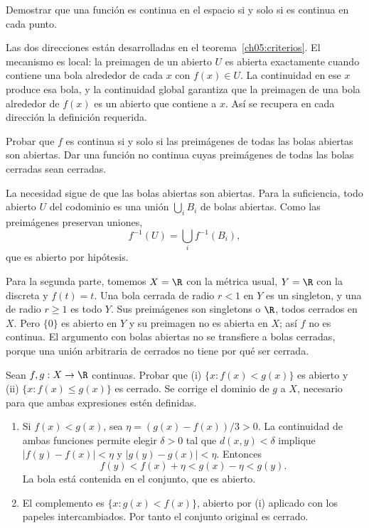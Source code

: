 \begin{ejercicio}\label{ej:lectura-5-2}
Demostrar que una función es continua en el espacio si y solo si es continua en cada punto.
\end{ejercicio}
\begin{solucion}
Las dos direcciones están desarrolladas en el teorema~\ref{ch05:criterios}. El mecanismo es local: la preimagen de un abierto $U$ es abierta exactamente cuando contiene una bola alrededor de cada $x$ con $f(x)\in U$. La continuidad en ese $x$ produce esa bola, y la continuidad global garantiza que la preimagen de una bola alrededor de $f(x)$ es un abierto que contiene a $x$. Así se recupera en cada dirección la definición requerida.
\end{solucion}

\begin{ejercicio}\label{ej:lectura-5-3}
Probar que $f$ es continua si y solo si las preimágenes de todas las bolas abiertas son abiertas. Dar una función no continua cuyas preimágenes de todas las bolas cerradas sean cerradas.
\end{ejercicio}
\begin{solucion}
La necesidad sigue de que las bolas abiertas son abiertas. Para la suficiencia, todo abierto $U$ del codominio es una unión $\bigcup_iB_i$ de bolas abiertas. Como las preimágenes preservan uniones,
\[
f^{-1}(U)=\bigcup_i f^{-1}(B_i),
\]
que es abierto por hipótesis.

Para la segunda parte, tomemos $X=\R$ con la métrica usual, $Y=\R$ con la discreta y $f(t)=t$. Una bola cerrada de radio $r<1$ en $Y$ es un singleton, y una de radio $r\ge1$ es todo $Y$. Sus preimágenes son singletons o $\R$, todos cerrados en $X$. Pero $\{0\}$ es abierto en $Y$ y su preimagen no es abierta en $X$; así $f$ no es continua. El argumento con bolas abiertas no se transfiere a bolas cerradas, porque una unión arbitraria de cerrados no tiene por qué ser cerrada.
\end{solucion}

\begin{ejercicio}\label{ej:lectura-5-4}
Sean $f,g:X\to\R$ continuas. Probar que (i) $\{x:f(x)<g(x)\}$ es abierto y (ii) $\{x:f(x)\le g(x)\}$ es cerrado. Se corrige el dominio de $g$ a $X$, necesario para que ambas expresiones estén definidas.
\end{ejercicio}
\begin{solucion}
\begin{enumerate}[label=(\roman*)]
\item Si $f(x)<g(x)$, sea $\eta=(g(x)-f(x))/3>0$. La continuidad de ambas funciones permite elegir $\delta>0$ tal que $d(x,y)<\delta$ implique $|f(y)-f(x)|<\eta$ y $|g(y)-g(x)|<\eta$. Entonces
\[
f(y)<f(x)+\eta<g(x)-\eta<g(y).
\]
La bola está contenida en el conjunto, que es abierto.
\item El complemento es $\{x:g(x)<f(x)\}$, abierto por (i) aplicado con los papeles intercambiados. Por tanto el conjunto original es cerrado.
\end{enumerate}
\end{solucion}

